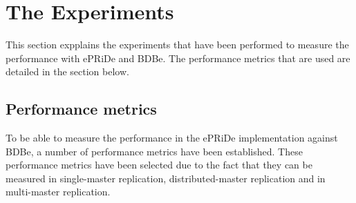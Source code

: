 \section{The Experiments} %
\label{sec:experiments}

This section expplains the experiments that have been performed to measure the performance with ePRiDe and BDBe. The performance metrics that are used are detailed in the section below.

\subsection{Performance metrics} %
\label{sub:experiments_performance_metrics}

To be able to measure the performance in the ePRiDe implementation against BDBe, a number of performance metrics have been established. These performance metrics have been selected due to the fact that they can be measured in single-master replication, distributed-master replication and in multi-master replication.
